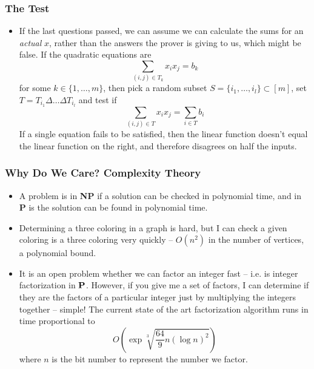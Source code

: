\documentclass{beamer}
\begin{document}
\begin{frame}
    \frametitle{The Test}

    \begin{itemize}
        \item If the last questions passed, we can assume we can calculate the sums for an {\it actual} $x$, rather than the answers the prover is giving to us, which might be false. If the quadratic equations are
        \[ \sum_{(i,j) \in T_k} x_ix_j = b_k \]
        for some $k \in \{ 1, \dots, m \}$, then pick a random subset $S = \{ i_1, \dots, i_l \} \subset [m]$, set $T = T_{i_1} \Delta \dots \Delta T_{i_l}$ and test if
        \[ \sum_{(i,j) \in T} x_ix_j = \sum_{i \in T} b_i \]
        If a single equation fails to be satisfied, then the linear function doesn't equal the linear function on the right, and therefore disagrees on half the inputs.
    \end{itemize}
\end{frame}

\begin{frame}
    \frametitle{Why Do We Care? Complexity Theory}

    \begin{itemize}
        \item A problem is in {\bf NP} if a solution can be checked in polynomial time, and in {\bf P} is the solution can be found in polynomial time.

        \item Determining a three coloring in a graph is hard, but I can check a given coloring is a three coloring very quickly -- $O(n^2)$ in the number of vertices, a polynomial bound.

        \item It is an open problem whether we can factor an integer fast -- i.e. is integer factorization in ${\bf P}$. However, if you give me a set of factors, I can determine if they are the factors of a particular integer just by multiplying the integers together -- simple! The current state of the art factorization algorithm runs in time proportional to
        \[ O \left( \exp \sqrt[3]{\frac{64}{9} n (\log n)^2} \right) \]
        where $n$ is the bit number to represent the number we factor.
    \end{itemize}
\end{frame}
\end{document}
